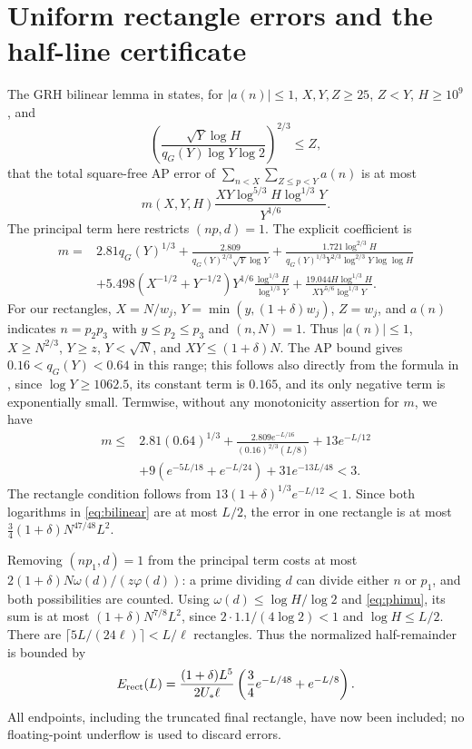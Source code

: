 \documentclass[11pt]{article}
\newcommand{\om}{\omega}
\begin{document}
\section{Uniform rectangle errors and the half-line certificate}
The GRH bilinear lemma in \cite{BS} states, for $|a(n)|\le1$,
$X,Y,Z\ge25$, $Z<Y$, $H\ge10^9$, and
\[
\left(\frac{\sqrt Y\log H}{q_G(Y)\log Y\log2}\right)^{2/3}\le Z,
\]
that the total square-free AP error of
$\sum_{n<X}\sum_{Z\le p<Y}a(n)$ is at most
\begin{equation}\label{eq:bilinear}
m(X,Y,H)\frac{XY\log^{5/3}H\log^{1/3}Y}{Y^{1/6}}.
\end{equation}
The principal term here restricts $(np,d)=1$. The explicit coefficient is
\begin{align*}
m={}&2.81q_G(Y)^{1/3}
+\frac{2.809}{q_G(Y)^{2/3}\sqrt Y\log Y}
+\frac{1.721\log^{2/3}H}{q_G(Y)^{1/3}Y^{2/3}\log^{2/3}Y\log\log H}\\
&+5.498(X^{-1/2}+Y^{-1/2})Y^{1/6}
\frac{\log^{1/3}H}{\log^{1/3}Y}
+\frac{19.044H\log^{1/3}H}{XY^{5/6}\log^{1/3}Y}.
\end{align*}
For our rectangles, $X=N/w_j$, $Y=\min(y,(1+\delta)w_j)$,
$Z=w_j$, and $a(n)$ indicates $n=p_2p_3$ with
$y\le p_2\le p_3$ and $(n,N)=1$. Thus $|a(n)|\le1$,
$X\ge N^{2/3}$, $Y\ge z$, $Y<\sqrt N$, and $XY\le(1+\delta)N$.
The AP bound gives $0.16<q_G(Y)<0.64$ in this range; this follows
also directly from the formula in \cite[Section 2]{BS}, since
$\log Y\ge1062.5$, its constant term is $0.165$, and its only
negative term is exponentially small.
Termwise, without any monotonicity assertion for $m$, we have
\begin{align*}
m\le{}&2.81(0.64)^{1/3}
+\frac{2.809e^{-L/16}}{(0.16)^{2/3}(L/8)}
+13e^{-L/12}\\
&+9(e^{-5L/18}+e^{-L/24})+31e^{-13L/48}<3.
\end{align*}
The rectangle condition follows from
$13(1+\delta)^{1/3}e^{-L/12}<1$.
Since both logarithms in \eqref{eq:bilinear} are at most $L/2$,
the error in one rectangle is at most
$\frac34(1+\delta)N^{47/48}L^2$.

Removing $(np_1,d)=1$ from the principal term costs at most
$2(1+\delta)N\om(d)/(z\varphi(d))$: a prime dividing $d$ can
divide either $n$ or $p_1$, and both possibilities are counted.
Using $\om(d)\le\log H/\log2$ and \eqref{eq:phimu}, its sum
is at most $(1+\delta)N^{7/8}L^2$, since
$2\cdot1.1/(4\log2)<1$ and $\log H\le L/2$.
There are $\lceil5L/(24\ell)\rceil<L/\ell$ rectangles.
Thus the normalized half-remainder is bounded by
\begin{equation}\label{eq:Erect}
E_{\rm rect}(L)=\frac{(1+\delta)L^5}{2U_*\ell}
\left(\frac34e^{-L/48}+e^{-L/8}\right).
\end{equation}
All endpoints, including the truncated final rectangle, have now
been included; no floating-point underflow is used to discard errors.
\end{document}
